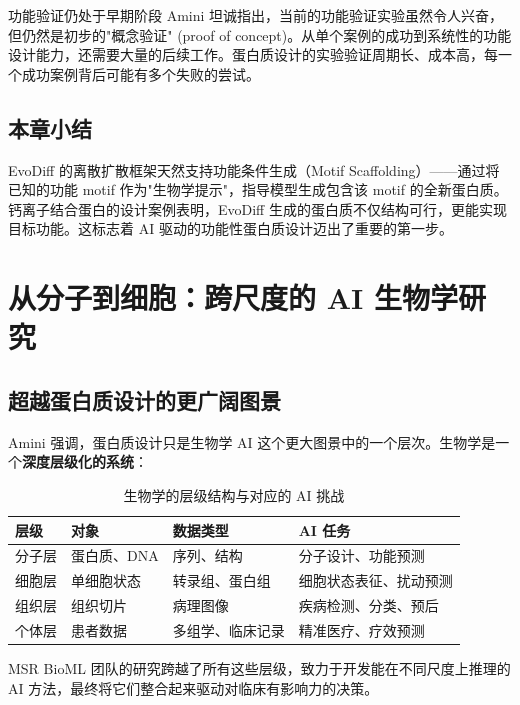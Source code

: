 \documentclass[a4paper]{article}
\begin{document}
\begin{warningbox}{功能验证仍处于早期阶段}
Amini 坦诚指出，当前的功能验证实验虽然令人兴奋，但仍然是初步的"概念验证" (proof of concept)。从单个案例的成功到系统性的功能设计能力，还需要大量的后续工作。蛋白质设计的实验验证周期长、成本高，每一个成功案例背后可能有多个失败的尝试。
\end{warningbox}

\subsection{本章小结}

EvoDiff 的离散扩散框架天然支持功能条件生成（Motif Scaffolding）——通过将已知的功能 motif 作为"生物学提示"，指导模型生成包含该 motif 的全新蛋白质。钙离子结合蛋白的设计案例表明，EvoDiff 生成的蛋白质不仅结构可行，更能实现目标功能。这标志着 AI 驱动的功能性蛋白质设计迈出了重要的第一步。


\section{从分子到细胞：跨尺度的 AI 生物学研究}

\subsection{超越蛋白质设计的更广阔图景}

Amini 强调，蛋白质设计只是生物学 AI 这个更大图景中的一个层次。生物学是一个\textbf{深度层级化的系统}：

\begin{table}[H]
\centering
\caption{生物学的层级结构与对应的 AI 挑战}
\begin{tabular}{@{}llll@{}}
\toprule
\textbf{层级} & \textbf{对象} & \textbf{数据类型} & \textbf{AI 任务} \\
\midrule
分子层 & 蛋白质、DNA & 序列、结构 & 分子设计、功能预测 \\
细胞层 & 单细胞状态 & 转录组、蛋白组 & 细胞状态表征、扰动预测 \\
组织层 & 组织切片 & 病理图像 & 疾病检测、分类、预后 \\
个体层 & 患者数据 & 多组学、临床记录 & 精准医疗、疗效预测 \\
\bottomrule
\end{tabular}
\end{table}

MSR BioML 团队的研究跨越了所有这些层级，致力于开发能在不同尺度上推理的 AI 方法，最终将它们整合起来驱动对临床有影响力的决策。
\end{document}
